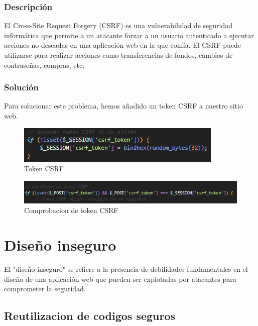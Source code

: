 \documentclass{report}
\begin{document}
                \subsubsection{Descripción}
                    El Cross-Site Request Forgery (CSRF) es una vulnerabilidad de seguridad informática que permite a un atacante forzar a un usuario autenticado a ejecutar acciones no deseadas en una aplicación web en la que confía. El CSRF puede utilizarse para realizar acciones como transferencias de fondos, cambios de contraseñas, compras, etc.
                \subsubsection{Solución}
                    Para solucionar este problema, hemos añadido un token CSRF a nuestro sitio web.
                    \begin{figure}[H]
                        \centering
                        \includegraphics[width=\textwidth]{./img/vulnerabilidades/3.3/3.1.png}
                        \caption{Token CSRF}
                    \end{figure}
                    \begin{figure}[H]
                        \centering
                        \includegraphics[width=\textwidth]{./img/vulnerabilidades/3.3/3.2.png}
                        \caption{Comprobacion de token CSRF}
                    \end{figure}
            \clearpage
        \section{Diseño inseguro}
            El "diseño inseguro" se refiere a la presencia de debilidades fundamentales en el diseño de una aplicación web que pueden ser explotadas por atacantes para comprometer la seguridad.
            \subsection{Reutilizacion de codigos seguros}
\end{document}
